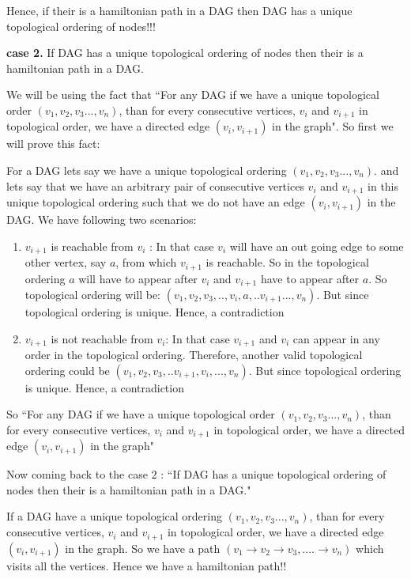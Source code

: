 \documentclass[answers]{exam}
\begin{document}
\begin{questions}
\begin{solution}
    Hence, if their is a hamiltonian path in a DAG then DAG has a unique topological ordering of nodes!!!


\textbf{case 2.} If DAG has a unique topological ordering of nodes then their is a hamiltonian path in a DAG.

We will be using the fact that ``For any DAG if we have a unique topological order $(v_1,v_2,v_3...,v_n)$, than for every consecutive vertices, $v_i$ and $v_{i+1}$ in topological order, we have a directed edge $(v_i,v_{i+1})$ in the graph". So first we will prove this fact:\par

\par
For a DAG lets say we have a unique topological ordering $(v_1,v_2,v_3...,v_n)$. and lets say that we have an arbitrary pair of consecutive vertices $v_i$ and $v_{i+1}$ in this unique topological ordering such that we do not have an edge $(v_i,v_{i+1})$ in the DAG. We have following two scenarios:
\begin{enumerate}
    \item $v_{i+1}$ is reachable from $v_i$ : In that case $v_i$ will have an out going edge to some other vertex, say $a$, from which $v_{i+1}$ is reachable. So in the topological ordering  $a$ will have to appear after $v_i$ and $v_{i+1}$ have to appear after $a$.
    So topological ordering will be: $(v_1,v_2,v_3,..,v_i,a,..v_{i+1}...,v_n)$. But since topological ordering is unique. Hence, a contradiction
    \item $v_{i+1}$ is not reachable from $v_i$: In that case $v_{i+1}$ and $v_i$ can appear in any order in the topological ordering. Therefore, another valid topological ordering could be $(v_1,v_2,v_3,..v_{i+1},v_i,...,v_n)$. But since topological ordering is unique. Hence, a contradiction
\end{enumerate}

So ``For any DAG if we have a unique topological order $(v_1,v_2,v_3...,v_n)$, than for every consecutive vertices, $v_i$ and $v_{i+1}$ in topological order, we have a directed edge $(v_i,v_{i+1})$ in the graph"

Now coming back to the case $2$ : ``If DAG has a unique topological ordering of nodes then their is a hamiltonian path in a DAG."

If a DAG have a unique topological ordering $(v_1,v_2,v_3...,v_n)$, than for every consecutive vertices, $v_i$ and $v_{i+1}$ in topological order, we have a directed edge $(v_i,v_{i+1})$ in the graph. So we have a path $(v_1\rightarrow v_2\rightarrow v_3,....\rightarrow v_n)$ which visits all the vertices. Hence we have a hamiltonian path!!


\end{solution}
\end{questions}
\end{document}
